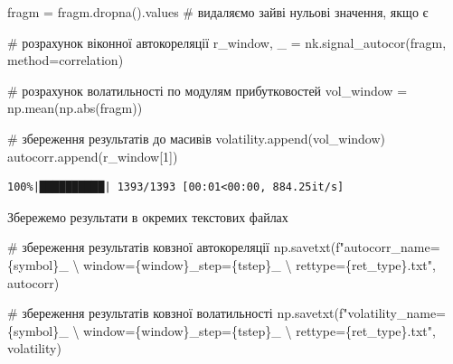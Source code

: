 \documentclass[
  letterpaper,
]{report}
\newenvironment{Shaded}{\begin{snugshade}}{\end{snugshade}}
\newcommand{\BuiltInTok}[1]{\textcolor[rgb]{0.00,0.23,0.31}{#1}}
\newcommand{\CharTok}[1]{\textcolor[rgb]{0.13,0.47,0.30}{#1}}
\newcommand{\CommentTok}[1]{\textcolor[rgb]{0.37,0.37,0.37}{#1}}
\newcommand{\DecValTok}[1]{\textcolor[rgb]{0.68,0.00,0.00}{#1}}
\newcommand{\NormalTok}[1]{\textcolor[rgb]{0.00,0.23,0.31}{#1}}
\newcommand{\OperatorTok}[1]{\textcolor[rgb]{0.37,0.37,0.37}{#1}}
\newcommand{\SpecialCharTok}[1]{\textcolor[rgb]{0.37,0.37,0.37}{#1}}
\newcommand{\SpecialStringTok}[1]{\textcolor[rgb]{0.13,0.47,0.30}{#1}}
\newcommand{\StringTok}[1]{\textcolor[rgb]{0.13,0.47,0.30}{#1}}
\begin{document}
\begin{Shaded}
\begin{Highlighting}[]
\NormalTok{    fragm }\OperatorTok{=}\NormalTok{ fragm.dropna().values         }\CommentTok{\# видаляємо зайві нульові значення, якщо є}
    
    \CommentTok{\# розрахунок віконної автокореляції}
\NormalTok{    r\_window, \_ }\OperatorTok{=}\NormalTok{ nk.signal\_autocor(fragm, method}\OperatorTok{=}\StringTok{\textquotesingle{}correlation\textquotesingle{}}\NormalTok{) }

    \CommentTok{\# розрахунок волатильності по модулям прибутковостей                                     }
\NormalTok{    vol\_window }\OperatorTok{=}\NormalTok{ np.mean(np.}\BuiltInTok{abs}\NormalTok{(fragm))}

    \CommentTok{\# збереження результатів до масивів}
\NormalTok{    volatility.append(vol\_window)}
\NormalTok{    autocorr.append(r\_window[}\DecValTok{1}\NormalTok{])}
\end{Highlighting}
\end{Shaded}

\begin{verbatim}
100%|██████████| 1393/1393 [00:01<00:00, 884.25it/s]
\end{verbatim}

Збережемо результати в окремих текстових файлах

\begin{Shaded}
\begin{Highlighting}[]
\CommentTok{\# збереження результатів ковзної автокореляції}
\NormalTok{np.savetxt(}\SpecialStringTok{f"autocorr\_name=}\SpecialCharTok{\{}\NormalTok{symbol}\SpecialCharTok{\}}\SpecialStringTok{\_ }\CharTok{\textbackslash{}}
\SpecialStringTok{            window=}\SpecialCharTok{\{}\NormalTok{window}\SpecialCharTok{\}}\SpecialStringTok{\_step=}\SpecialCharTok{\{}\NormalTok{tstep}\SpecialCharTok{\}}\SpecialStringTok{\_ }\CharTok{\textbackslash{}}
\SpecialStringTok{            rettype=}\SpecialCharTok{\{}\NormalTok{ret\_type}\SpecialCharTok{\}}\SpecialStringTok{.txt"}\NormalTok{, autocorr)}

\CommentTok{\# збереження результатів ковзної волатильності}
\NormalTok{np.savetxt(}\SpecialStringTok{f"volatility\_name=}\SpecialCharTok{\{}\NormalTok{symbol}\SpecialCharTok{\}}\SpecialStringTok{\_ }\CharTok{\textbackslash{}}
\SpecialStringTok{            window=}\SpecialCharTok{\{}\NormalTok{window}\SpecialCharTok{\}}\SpecialStringTok{\_step=}\SpecialCharTok{\{}\NormalTok{tstep}\SpecialCharTok{\}}\SpecialStringTok{\_ }\CharTok{\textbackslash{}}
\SpecialStringTok{            rettype=}\SpecialCharTok{\{}\NormalTok{ret\_type}\SpecialCharTok{\}}\SpecialStringTok{.txt"}\NormalTok{, volatility)}
\end{Highlighting}
\end{Shaded}
\end{document}

